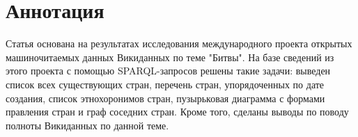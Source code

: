 \section{Аннотация}

Статья основана на результатах исследования международного проекта открытых машиночитаемых данных Викиданных по теме "Битвы". На базе сведений из этого проекта с помощью SPARQL-запросов решены такие задачи: выведен список всех существующих стран, перечень стран, упорядоченных по дате создания, список этнохоронимов стран, пузырьковая диаграмма с формами правления стран и граф соседних стран. Кроме того, сделаны выводы по поводу полноты Викиданных по данной теме.